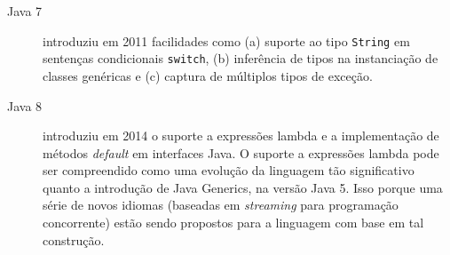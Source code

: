 \begin{description}
\item[Java 7] introduziu em 2011 facilidades como (a) suporte ao tipo \texttt{String} 
em senten\c cas condicionais \texttt{switch}, (b) infer\^{e}ncia de tipos 
na instancia\c c\~{a}o de classes gen\'{e}ricas e (c) captura de 
m\'{u}ltiplos tipos de exce\c c\~{a}o. 

\item[Java 8] introduziu em 2014 o suporte a express\~{o}es lambda e a implementa\c c\~{a}o de 
m\'{e}todos \emph{default} em interfaces Java. O suporte a express\~{o}es lambda pode 
ser compreendido como uma evolu\c c\~{a}o da linguagem t\~{a}o significativo 
quanto a introdu\c c\~{a}o de Java Generics, na vers\~{a}o Java 5. Isso porque 
uma s\'{e}rie de novos idiomas (baseadas em \emph{streaming} para programa\c c\~{a}o 
concorrente) est\~{a}o sendo propostos para a linguagem com base em tal constru\c c\~{a}o.   
\end{description} 





